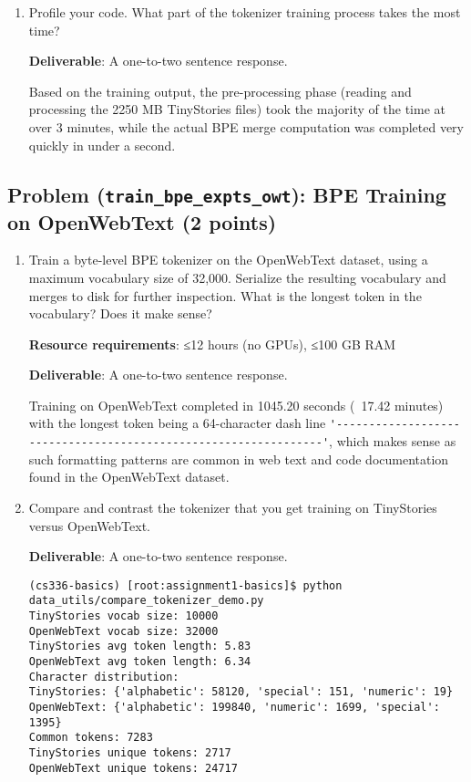 \documentclass{article}
\newcounter{problem}
\newcommand{\problem}[2]{
    \stepcounter{problem}
    \subsection{Problem (\texttt{#1}): #2}
    \vspace{-1.5em} %
    \noindent
}
\begin{document}
\begin{enumerate}[label=(\alph*)]
    \item Profile your code. What part of the tokenizer training process takes the most time?
    
    \textbf{Deliverable}: A one-to-two sentence response.
    
    \begin{answer}
    Based on the training output, the pre-processing phase (reading and processing the 2250 MB TinyStories files) took the majority of the time at over 3 minutes, while the actual BPE merge computation was completed very quickly in under a second.
    \end{answer}
\end{enumerate}

\problem{train\_bpe\_expts\_owt}{BPE Training on OpenWebText (2 points)}

\begin{enumerate}[label=(\alph*)]
    \item Train a byte-level BPE tokenizer on the OpenWebText dataset, using a maximum vocabulary size of 32,000. Serialize the resulting vocabulary and merges to disk for further inspection. What is the longest token in the vocabulary? Does it make sense?
    
    \textbf{Resource requirements}: ≤12 hours (no GPUs), ≤100 GB RAM
    
    \textbf{Deliverable}: A one-to-two sentence response.
    
    \begin{answer}
    Training on OpenWebText completed in 1045.20 seconds (~17.42 minutes) with the longest token being a 64-character dash line \lstinline{'----------------------------------------------------------------'}, which makes sense as such formatting patterns are common in web text and code documentation found in the OpenWebText dataset.
    \end{answer}

    \item Compare and contrast the tokenizer that you get training on TinyStories versus OpenWebText.

    \textbf{Deliverable}: A one-to-two sentence response.

    \begin{lstlisting}
(cs336-basics) [root:assignment1-basics]$ python data_utils/compare_tokenizer_demo.py 
TinyStories vocab size: 10000
OpenWebText vocab size: 32000
TinyStories avg token length: 5.83
OpenWebText avg token length: 6.34
Character distribution:
TinyStories: {'alphabetic': 58120, 'special': 151, 'numeric': 19}
OpenWebText: {'alphabetic': 199840, 'numeric': 1699, 'special': 1395}
Common tokens: 7283
TinyStories unique tokens: 2717
OpenWebText unique tokens: 24717


\end{lstlisting}
\end{enumerate}
\end{document}
